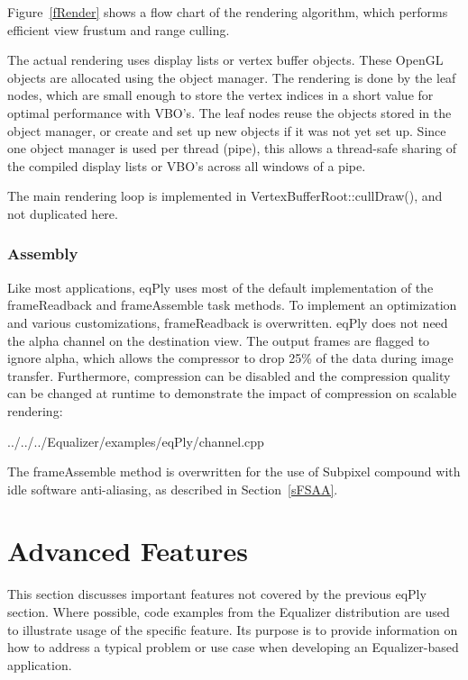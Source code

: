 \documentclass[10pt,a4]{scrartcl}
\newcommand{\fig}[1]{Figure~\ref{#1}}
\newcommand{\sref}[1]{Section~\ref{#1}}
\begin{document}
\fig{fRender} shows a flow chart of the rendering algorithm, which performs
efficient view frustum and range culling.

The actual rendering uses display lists or vertex buffer objects. These
OpenGL objects are allocated using the object manager. The rendering is
done by the leaf nodes, which are small enough to store the vertex
indices in a \textsf{short} value for optimal performance with VBO's.
The leaf nodes reuse the objects stored in the object manager, or create
and set up new objects if it was not yet set up. Since one object
manager is used per thread (pipe), this allows a thread-safe sharing of
the compiled display lists or VBO's across all windows of a pipe.

The main rendering loop is implemented in \textsf{VertexBufferRoot::cullDraw()},
and not duplicated here.

\subsubsection{Assembly}

Like most applications, eqPly uses most of the default implementation of the
\textsf{frameReadback} and \textsf{frameAssemble} task methods. To implement an
optimization and various customizations, \textsf{frameReadback} is
overwritten. eqPly does not need the alpha channel on the destination view. The
output frames are flagged to ignore alpha, which allows the compressor to drop
25\% of the data during image transfer. Furthermore, compression can be
disabled and the compression quality can be changed at runtime to demonstrate
the impact of compression on scalable rendering:

{\footnotesize
  {../../../Equalizer/examples/eqPly/channel.cpp}}

The \textsf{frameAssemble} method is overwritten for the use of Subpixel
compound with idle software anti-aliasing, as described in \sref{sFSAA}.



\section{Advanced Features}

This section discusses important features not covered by the previous
\textsf{eqPly} section. Where possible, code examples from the Equalizer
distribution are used to illustrate usage of the specific feature. Its
purpose is to provide information on how to address a typical problem or
use case when developing an Equalizer-based application.
\end{document}
